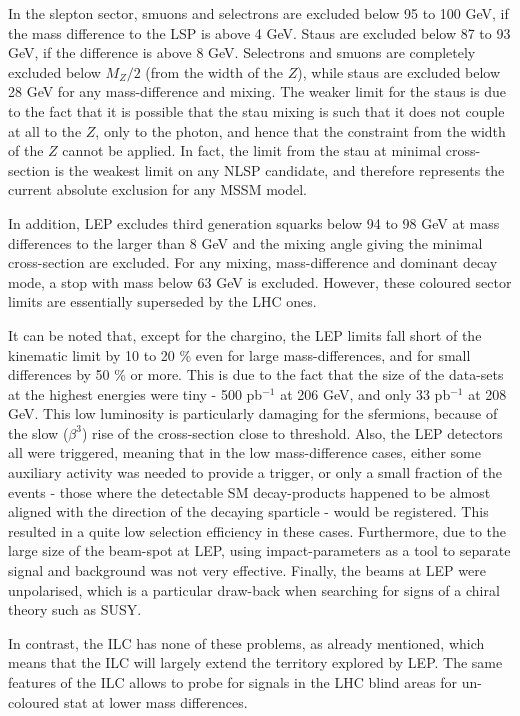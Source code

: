 In the slepton sector,
smuons and selectrons are excluded
below 95 to 100 GeV, if the mass difference to the LSP is
above 4 GeV. 
Staus are excluded below 87 to 93 GeV, 
if the difference is above 8 GeV. 
Selectrons and
smuons are completely excluded below $M_Z/2$ (from the width of the $Z$),
while staus are excluded below 28 GeV for any mass-difference and
mixing. 
The weaker limit for the staus is due to the fact that
it is possible that the stau mixing is such that it does not couple at
all to the $Z$, 
only to the photon, 
and hence that the constraint from the width of the $Z$ cannot be
applied.
In fact, the limit from the stau at minimal cross-section is the weakest limit on any
NLSP candidate, 
and therefore represents the current absolute exclusion for any MSSM model.

In addition, LEP excludes third generation squarks below 94 to 98 GeV at
mass differences to the   larger than 8 GeV 
and the mixing angle giving the
minimal cross-section are excluded. 
For any mixing, mass-difference and dominant
decay mode, 
a stop with mass below 63 GeV is excluded.
However, these coloured sector limits are
essentially superseded by the LHC ones.

It can be noted that, except for the chargino,
the LEP limits fall short of the kinematic limit
by 10 to 20 \% even for large mass-differences,
and for small differences by 50 \% or more.
This is due to the fact that the size of the data-sets at the
highest energies were tiny - 500 pb$^{-1}$ at 206 GeV, and
only 33  pb$^{-1}$ at 208 GeV.
This low luminosity is particularly damaging for the sfermions,
because of the slow ($\beta^3$) rise of the cross-section close to threshold.
Also,
the LEP detectors all were triggered,
meaning that in the low mass-difference cases,
either some auxiliary activity was needed to provide
a trigger, 
or only a small fraction of the events - 
those where the detectable SM decay-products happened to be
almost aligned with the direction of the decaying sparticle -
would be registered.
This resulted in a quite low selection efficiency in these cases.
Furthermore,
due to the large size of the beam-spot at LEP,
using impact-parameters as a tool to separate signal
and background was not very effective.
Finally,
the beams at LEP were unpolarised,
which is a particular draw-back when searching for signs
of a chiral theory such as SUSY.

In contrast, the ILC has none of these problems,
as already mentioned,
which means that the ILC will largely extend the
territory explored by LEP.
The same features of the ILC allows to probe for signals in the
LHC blind areas for un-coloured stat at lower mass differences.

